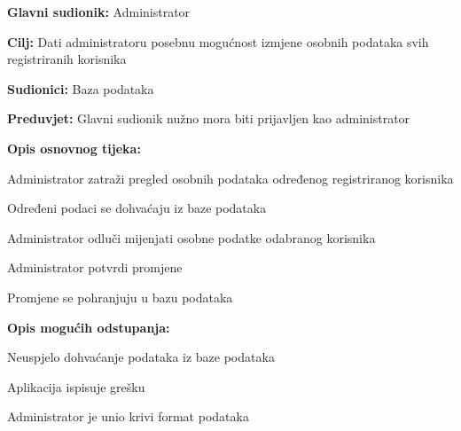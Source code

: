     				\begin{packed_item}
    					
    					\item \textbf{Glavni sudionik:} Administrator
    					\item  \textbf{Cilj:} Dati administratoru posebnu mogućnost izmjene osobnih podataka svih registriranih korisnika
    					\item  \textbf{Sudionici:} Baza podataka
    					\item  \textbf{Preduvjet:} Glavni sudionik nužno mora biti prijavljen kao administrator
    					\item  \textbf{Opis osnovnog tijeka:}
    					
    					\item[] \begin{packed_enum}
    						
    						\item Administrator zatraži pregled osobnih podataka određenog registriranog korisnika
    						\item Određeni podaci se dohvaćaju iz baze podataka
    						\item Administrator odluči mijenjati osobne podatke odabranog korisnika
    						\item Administrator potvrdi promjene
    						\item Promjene se pohranjuju u bazu podataka
    					\end{packed_enum}
    					
    					\item  \textbf{Opis mogućih odstupanja:}
    					
    					\item[] \begin{packed_item}
    						
    						\item[2.a] Neuspjelo dohvaćanje podataka iz baze podataka
    						\item[] \begin{packed_enum}
    							
    							\item Aplikacija ispisuje grešku
    							
    						\end{packed_enum}
    						\item[3.a] Administrator je unio krivi format podataka
    						\item[] \begin{packed_enum}
    							

\end{packed_enum}
\end{packed_item}
\end{packed_item}
